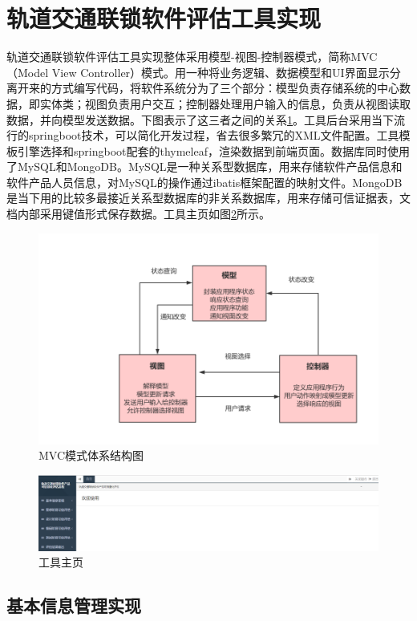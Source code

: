 \section{轨道交通联锁软件评估工具实现}
轨道交通联锁软件评估工具实现整体采用模型-视图-控制器模式，简称MVC（Model View Controller）模式。用一种将业务逻辑、数据模型和UI界面显示分离开来的方式编写代码，将软件系统分为了三个部分：模型负责存储系统的中心数据，即实体类；视图负责用户交互；控制器处理用户输入的信息，负责从视图读取数据，并向模型发送数据。\cite{mvc体系结构}下图表示了这三者之间的关系\ref{fig:5_03}。工具后台采用当下流行的springboot技术，可以简化开发过程，省去很多繁冗的XML文件配置。工具模板引擎选择和springboot配套的thymeleaf，渲染数据到前端页面。数据库同时使用了MySQL和MongoDB。MySQL是一种关系型数据库，用来存储软件产品信息和软件产品人员信息，对MySQL的操作通过ibatis框架配置的映射文件。MongoDB是当下用的比较多最接近关系型数据库的非关系数据库，用来存储可信证据表，文档内部采用键值形式保存数据。工具主页如图\ref{fig:5_03_1}所示。
\begin{figure}[H]
	\centering
	\includegraphics[width=13cm]{fig/5_03.png}
	\caption{MVC模式体系结构图}
	\label{fig:5_03}
\end{figure}

\begin{figure}[H]
	\centering
	\includegraphics[width=13cm]{fig/5_03_1.png}
	\caption{工具主页}
	\label{fig:5_03_1}
\end{figure}

\subsection{基本信息管理实现}

